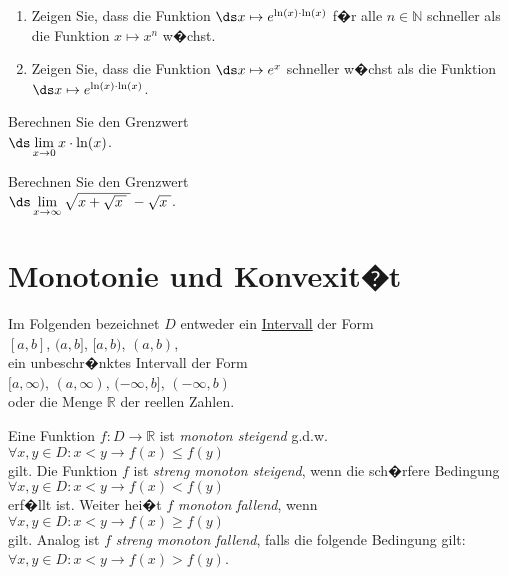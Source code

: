 \exercise
\begin{enumerate}
\item Zeigen Sie, dass die Funktion $\ds x \mapsto e^{\ln(x) \cdot \ln(x)}$ f�r alle $n \in \mathbb{N}$ schneller
      als die Funktion $x \mapsto x^n$ w�chst.
\item Zeigen Sie, dass die Funktion $\ds x \mapsto e^x$ schneller w�chst als die Funktion
      $\ds x \mapsto e^{\ln(x) \cdot \ln(x)}$. \eox
\end{enumerate} 

\exercise
Berechnen Sie den Grenzwert
\\[0.2cm]
\hspace*{1.3cm}
$\ds\lim\limits_{x \rightarrow 0} x \cdot \ln(x)$.  \eox
\pagebreak

\exercise
Berechnen Sie den Grenzwert
\\[0.2cm]
\hspace*{1.3cm}
$\ds\lim\limits_{x \rightarrow \infty} \sqrt{x + \sqrt{x\;}\;} - \sqrt{x\;}$.  \eox


\section{Monotonie und Konvexit�t}
Im Folgenden bezeichnet $D$ entweder ein
\href{http://de.wikipedia.org/wiki/Intervall_(Mathematik)}{Intervall} der Form
\\[0.2cm]
\hspace*{1.3cm}
$[a, b]$, \quad  
$(a, b]$, \quad   
$[a, b)$, \quad    
$(a, b)$,
\\[0.2cm]
ein unbeschr�nktes Intervall der Form
\\[0.2cm]
\hspace*{1.3cm}
$[a, \infty)$, \quad      
$(a, \infty)$, \quad       
$(-\infty, b]$, \quad        
$(-\infty, b)$ \quad        
\\[0.2cm]
oder die Menge $\mathbb{R}$ der reellen Zahlen.

\begin{Definition}[monoton]
  Eine Funktion $f: D \rightarrow \mathbb{R}$ ist \emph{monoton steigend} g.d.w.
  \\[0.2cm]
  \hspace*{1.3cm}
  $\forall x,y \in D: x < y \rightarrow f(x) \leq f(y)$
  \\[0.2cm]
  gilt.  Die Funktion $f$ ist \emph{streng monoton steigend}, wenn die sch�rfere Bedingung
  \\[0.2cm]
  \hspace*{1.3cm}
  $\forall x,y \in D: x < y \rightarrow f(x) < f(y)$
  \\[0.2cm]
  erf�llt ist.  Weiter hei�t  $f$ \emph{monoton fallend}, wenn
  \\[0.2cm]
  \hspace*{1.3cm}
  $\forall x,y \in D: x < y \rightarrow f(x) \geq f(y)$
  \\[0.2cm]
  gilt.  Analog ist $f$ \emph{streng monoton fallend}, falls die folgende Bedingung gilt:
  \\[0.2cm]
  \hspace*{1.3cm}
  $\forall x,y \in D: x < y \rightarrow f(x) > f(y)$.
  \eod
\end{Definition}

